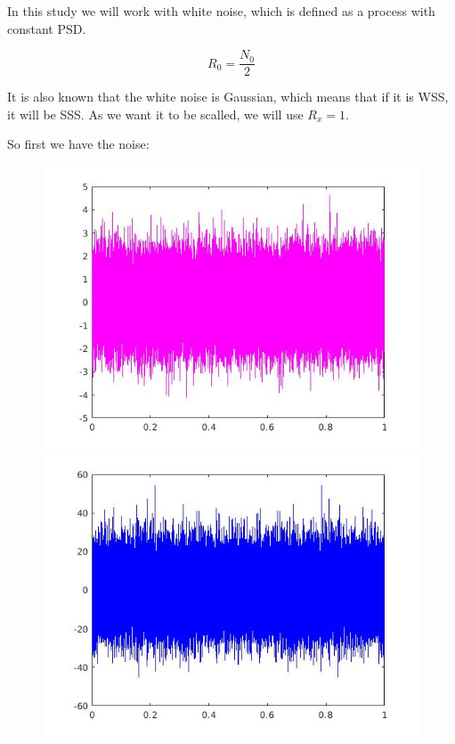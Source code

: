 \documentclass[a4paper,11pt]{article}
\begin{document}
In this study we will work with white noise, which is defined as a process with constant PSD.

\begin{equation}R_0 = \frac{N_0}{2}\end{equation}

It is also known that the white noise is Gaussian, which means that if it is WSS, it will be SSS. As we want it to be scalled, we will use $R_x=1$.

So first we have the noise:

\begin{figure}[!hp]
\centering
\begin{minipage}{.5\textwidth}
  \centering
  \includegraphics[width=1\linewidth]{images/lab1_1.jpg}
\end{minipage}%
\begin{minipage}{.5\textwidth}
  \centering
  \includegraphics[width=1\linewidth]{images/lab1_2.jpg}
\end{minipage}
\end{figure}
\end{document}
